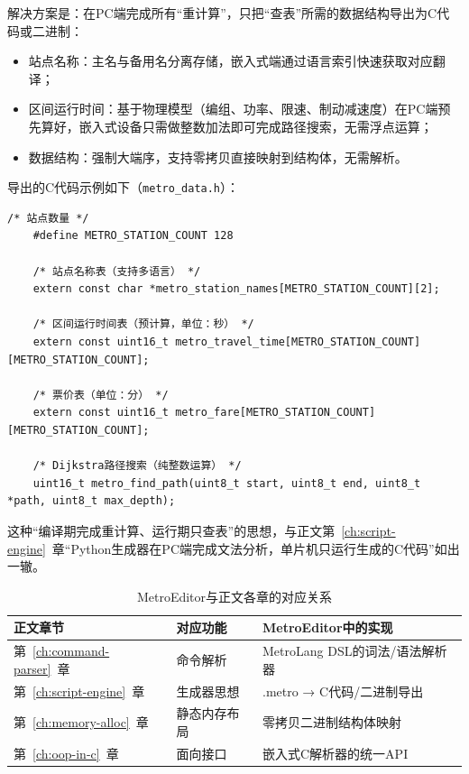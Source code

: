 解决方案是：在PC端完成所有“重计算”，只把“查表”所需的数据结构导出为C代码或二进制：

\begin{itemize}
	\item 站点名称：主名与备用名分离存储，嵌入式端通过语言索引快速获取对应翻译；
	\item 区间运行时间：基于物理模型（编组、功率、限速、制动减速度）在PC端预先算好，嵌入式设备只需做整数加法即可完成路径搜索，无需浮点运算；
	\item 数据结构：强制大端序，支持零拷贝直接映射到结构体，无需解析。
\end{itemize}

导出的C代码示例如下（\texttt{metro\_data.h}）：

\begin{lstlisting}[style=c]
	/* 站点数量 */
	#define METRO_STATION_COUNT 128
	
	/* 站点名称表（支持多语言） */
	extern const char *metro_station_names[METRO_STATION_COUNT][2];
	
	/* 区间运行时间表（预计算，单位：秒） */
	extern const uint16_t metro_travel_time[METRO_STATION_COUNT][METRO_STATION_COUNT];
	
	/* 票价表（单位：分） */
	extern const uint16_t metro_fare[METRO_STATION_COUNT][METRO_STATION_COUNT];
	
	/* Dijkstra路径搜索（纯整数运算） */
	uint16_t metro_find_path(uint8_t start, uint8_t end, uint8_t *path, uint8_t max_depth);
\end{lstlisting}

这种“编译期完成重计算、运行期只查表”的思想，与正文第~\ref{ch:script-engine}~章“Python生成器在PC端完成文法分析，单片机只运行生成的C代码”如出一辙。

\begin{table}[htbp]
	\centering
	\caption{MetroEditor与正文各章的对应关系}
	\label{tab:app-metro-mapping}
	\begin{tabular}{lll}
		\toprule
		正文章节 & 对应功能 & MetroEditor中的实现 \\
		\midrule
		第~\ref{ch:command-parser}~章 & 命令解析 & MetroLang DSL的词法/语法解析器 \\
		第~\ref{ch:script-engine}~章 & 生成器思想 & .metro → C代码/二进制导出 \\
		第~\ref{ch:memory-alloc}~章 & 静态内存布局 & 零拷贝二进制结构体映射 \\
		第~\ref{ch:oop-in-c}~章 & 面向接口 & 嵌入式C解析器的统一API \\
		\bottomrule
	\end{tabular}
\end{table}



